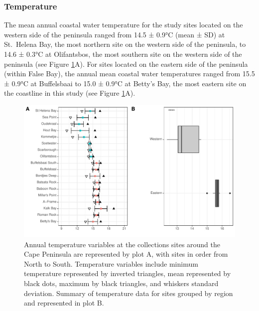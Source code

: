 \documentclass[
  a4paper,
]{article}
\begin{document}
\hypertarget{temperature-1}{%
\subsubsection{Temperature}\label{temperature-1}}

The mean annual coastal water temperature for the study sites located on
the western side of the peninsula ranged from 14.5 ± 0.9°C (mean ± SD)
at St.~Helena Bay, the most northern site on the western side of the
peninsula, to 14.6 ± 0.3°C at Olifantsbos, the most southern site on the
western side of the peninsula (see Figure
\ref{fig:Temperature variables plot}A). For sites located on the eastern
side of the peninsula (within False Bay), the annual mean coastal water
temperatures ranged from 15.5 ± 0.9°C at Buffelsbaai to 15.0 ± 0.9°C at
Betty's Bay, the most eastern site on the coastline in this study (see
Figure \ref{fig:Temperature variables plot}A).

\begin{figure}

{\centering \includegraphics{thesis_chapter_2_files/figure-latex/Temperature variables plot-1} 

}

\caption{\label{fig:Temperature variables plot}Annual temperature variables at the collections sites around the Cape Peninsula are represented by plot A, with sites in order from North to South. Temperature variables include minimum temperature represented by inverted triangles, mean represented by black dots, maximum by black triangles, and whiskers standard deviation. Summary of temperature data for sites grouped by region and represented in plot B.}\label{fig:Temperature variables plot}
\end{figure}
\end{document}
